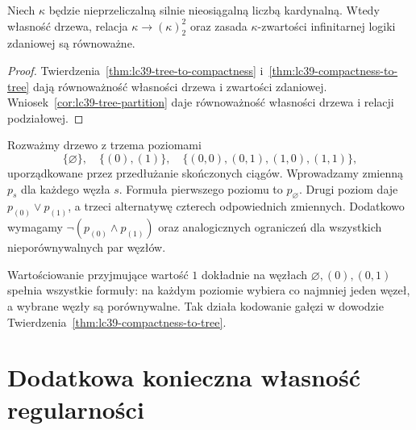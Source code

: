 \begin{wniosek}
\label{cor:lc39-compactness-equivalence}
Niech $\kappa$ będzie nieprzeliczalną
silnie nieosiągalną liczbą
kardynalną. Wtedy
własność drzewa, relacja
$\kappa\longrightarrow(\kappa)^2_2$
oraz zasada $\kappa$-zwartości
infinitarnej logiki zdaniowej
są równoważne.
\end{wniosek}
\begin{proof}
Twierdzenia~\ref{thm:lc39-tree-to-compactness}
i~\ref{thm:lc39-compactness-to-tree}
dają równoważność własności
drzewa i zwartości zdaniowej.
Wniosek~\ref{cor:lc39-tree-partition}
daje równoważność
własności drzewa i relacji
podziałowej.
\end{proof}

\begin{przyklad}
\label{ex:lc39-finite-branch}
Rozważmy drzewo z trzema poziomami
\[
 \{\varnothing\},\quad
 \{(0),(1)\},\quad
 \{(0,0),(0,1),(1,0),(1,1)\},
\]
uporządkowane przez
przedłużanie skończonych ciągów.
Wprowadzamy zmienną $p_s$
dla każdego węzła $s$.
Formuła pierwszego poziomu
to $p_\varnothing$.
Drugi poziom daje
$p_{(0)}\lor p_{(1)}$,
a trzeci alternatywę
czterech odpowiednich zmiennych.
Dodatkowo wymagamy
$\neg(p_{(0)}\land p_{(1)})$
oraz analogicznych
ograniczeń dla
wszystkich nieporównywalnych
par węzłów.

Wartościowanie przyjmujące
wartość $1$ dokładnie
na węzłach
$\varnothing,(0),(0,1)$
spełnia wszystkie formuły:
na każdym poziomie
wybiera co najmniej jeden
węzeł, a wybrane
węzły są porównywalne.
Tak działa kodowanie
gałęzi w dowodzie
Twierdzenia~\ref{thm:lc39-compactness-to-tree}.
\end{przyklad}

\section{Dodatkowa konieczna własność regularności}

